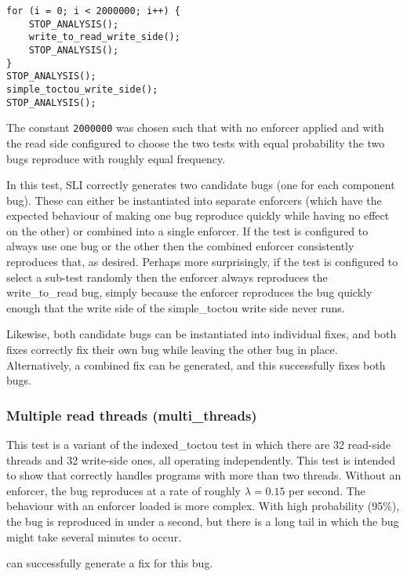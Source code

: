 \begin{verbatim}
for (i = 0; i < 2000000; i++) {
    STOP_ANALYSIS();
    write_to_read_write_side();
    STOP_ANALYSIS();
}
STOP_ANALYSIS();
simple_toctou_write_side();
STOP_ANALYSIS();
\end{verbatim}

The constant \verb|2000000| was chosen such that with no enforcer
applied and with the read side configured to choose the two tests with
equal probability the two bugs reproduce with roughly equal frequency.

In this test, SLI correctly generates two candidate bugs (one for each
component bug).  These can either be instantiated into separate
enforcers (which have the expected behaviour of making one bug
reproduce quickly while having no effect on the other) or combined
into a single enforcer.  If the test is configured to always use one
bug or the other then the combined enforcer consistently reproduces
that, as desired.  Perhaps more surprisingly, if the test is
configured to select a sub-test randomly then the enforcer always
reproduces the write\_to\_read bug, simply because the enforcer
reproduces the bug quickly enough that the write side of the
simple\_toctou write side never runs.

Likewise, both candidate bugs can be instantiated into individual
fixes, and both fixes correctly fix their own bug while leaving the
other bug in place.  Alternatively, a combined fix can be generated,
and this successfully fixes both bugs.

\subsubsection{Multiple read threads (multi\_threads)}

This test is a variant of the indexed\_toctou test in which there are
32 read-side threads and 32 write-side ones, all operating
independently.  This test is intended to show that {\implementation}
correctly handles programs with more than two threads.  Without an
enforcer, the bug reproduces at a rate of roughly $\lambda = 0.15$ per
second.  The behaviour with an enforcer loaded is more complex.  With
high probability (95\%), the bug is reproduced in under a second, but
there is a long tail in which the bug might take several minutes to
occur.  

{\Technique} can successfully generate a fix for this bug.


